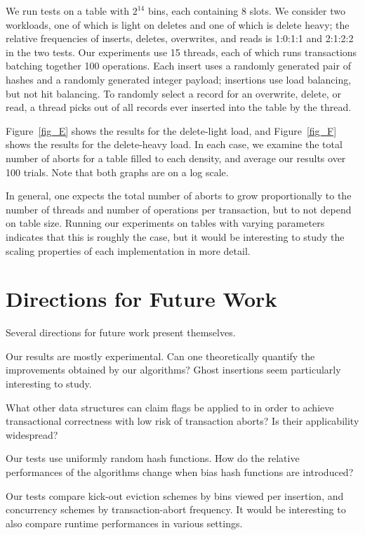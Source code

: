 \documentclass{sig-alternate-05-2015}
\begin{document}
We run tests on a table with $2^{14}$ bins, each containing $8$
slots. We consider two workloads, one of which is light on deletes and
one of which is delete heavy; the relative frequencies of inserts,
deletes, overwrites, and reads is 1:0:1:1 and 2:1:2:2 in the two
tests. Our experiments use 15 threads, each of which runs transactions
batching together 100 operations. Each insert uses a randomly
generated pair of hashes and a randomly generated integer payload;
insertions use load balancing, but not hit balancing. To randomly
select a record for an overwrite, delete, or read, a thread picks out
of all records ever inserted into the table by the thread.


Figure~\ref{fig_E} shows the results for the delete-light load, and
Figure~\ref{fig_F} shows the results for the delete-heavy load. In
each case, we examine the total number of aborts for a table filled to
each density, and average our results over 100 trials. Note that both
graphs are on a log scale.


In general, one expects the total number of aborts to grow
proportionally to the number of threads and number of operations per
transaction, but to not depend on table size. Running our experiments
on tables with varying parameters indicates that this is roughly the
case, but it would be interesting to study the scaling properties of
each implementation in more detail.




\section{Directions for Future Work}\label{seccon}

Several directions for future work present themselves.

Our results are mostly experimental. Can one theoretically quantify
the improvements obtained by our algorithms? Ghost insertions seem
particularly interesting to study.

What other data structures can claim flags be applied to in order to
achieve transactional correctness with low risk of transaction aborts?
Is their applicability widespread?

Our tests use uniformly random hash functions. How do the relative
performances of the algorithms change when bias hash functions are
introduced?

Our tests compare kick-out eviction schemes by bins viewed per
insertion, and concurrency schemes by transaction-abort frequency. It
would be interesting to also compare runtime performances in various
settings.
\end{document}
